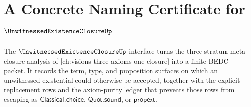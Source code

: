 \chapter{A Concrete Naming Certificate for $\UnwitnessedExistenceClosureUp$}
\label{ch:concrete-instances-unwitnessedexistenceclosure-namecert}

The $\UnwitnessedExistenceClosureUp$ interface turns the three-stratum meta-closure analysis of \autoref{ch:visions-three-axioms-one-closure} into a finite BEDC packet. It records the term, type, and proposition surfaces on which an unwitnessed existential could otherwise be accepted, together with the explicit replacement rows and the axiom-purity ledger that prevents those rows from escaping as $\mathsf{Classical.choice}$, $\mathsf{Quot.sound}$, or $\mathsf{propext}$.

